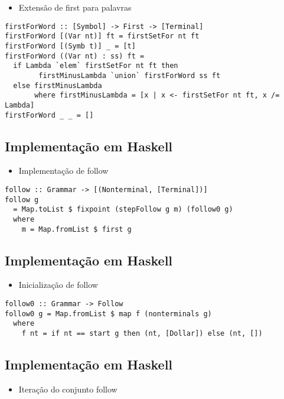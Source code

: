 \documentclass[11pt]{article}
\begin{document}
\begin{itemize}
\item Extensão de first para palavras
\end{itemize}

\begin{verbatim}
firstForWord :: [Symbol] -> First -> [Terminal]
firstForWord [(Var nt)] ft = firstSetFor nt ft
firstForWord [(Symb t)] _ = [t]
firstForWord ((Var nt) : ss) ft =
  if Lambda `elem` firstSetFor nt ft then 
        firstMinusLambda `union` firstForWord ss ft
  else firstMinusLambda
       where firstMinusLambda = [x | x <- firstSetFor nt ft, x /= Lambda]
firstForWord _ _ = []
\end{verbatim}
\subsection*{Implementação em Haskell}
\label{sec:org06ab902}

\begin{itemize}
\item Implementação de follow
\end{itemize}

\begin{verbatim}
follow :: Grammar -> [(Nonterminal, [Terminal])]
follow g
  = Map.toList $ fixpoint (stepFollow g m) (follow0 g)
  where
    m = Map.fromList $ first g
\end{verbatim}
\subsection*{Implementação em Haskell}
\label{sec:org3bca858}

\begin{itemize}
\item Inicialização de follow
\end{itemize}

\begin{verbatim}
follow0 :: Grammar -> Follow
follow0 g = Map.fromList $ map f (nonterminals g)
  where
    f nt = if nt == start g then (nt, [Dollar]) else (nt, [])
\end{verbatim}
\subsection*{Implementação em Haskell}
\label{sec:org46be6ae}

\begin{itemize}
\item Iteração do conjunto follow
\end{itemize}
\end{document}
